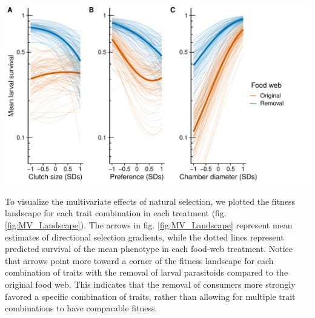 \documentclass[11pt,]{article}
\let\origfigure\figure
\let\endorigfigure\endfigure
\renewenvironment{figure}[1][2] {
    \expandafter\origfigure\expandafter[H]
} {
    \endorigfigure
}
\begin{document}
\begin{figure}
\centering
\includegraphics{../analyses/UV_landscapes.pdf}
\caption{\label{fig:UV_Landscape}Adaptive landscape of gall midge
phenotypes in the original food web and with the removal of larval
parasitoids. Each panel corresponds to a different phenotypic trait:
clutch size (A); oviposition preference (B); and chamber diameter (C).
Bold lines represent selection experienced in the original (orange) and
removal (blue) food webs. Thin lines represent bootstrapped replicates
to show the uncertainty in selection. For clarity, we only display 100
bootstraps even though inferences are based on 1,000 replicates. Note
that mean larval survival is plotted on a natural log scale to reflect
the mathematical definition of the \textbf{fitness} landscape.}
\end{figure}

\bigskip

To visualize the multivariate effects of natural selection, we plotted
the fitness landscape for each trait combination in each treatment (fig.
\ref{fig:MV_Landscape}). The arrows in fig. \ref{fig:MV_Landscape}
represent mean estimates of directional selection gradients, while the
dotted lines represent predicted survival of the mean phenotype in each
food-web treatment. Notice that arrows point more toward a corner of the
fitness landscape for each combination of traits with the removal of
larval parasitoids compared to the original food web. This indicates
that the removal of consumers more strongly favored a specific
combination of traits, rather than allowing for multiple trait
combinations to have comparable fitness.
\end{document}
